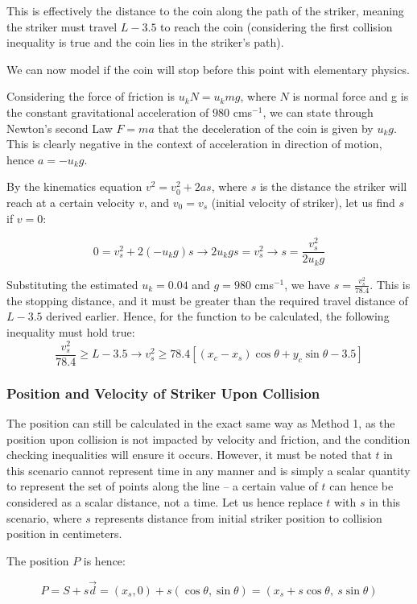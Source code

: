 \documentclass[10pt]{article}
\begin{document}
This is effectively the distance to the coin along the path of the striker, meaning the striker must travel $L-3.5$ to reach the coin (considering the first collision inequality is true and the coin lies in the striker's path). 

We can now model if the coin will stop before this point with elementary physics. 

Considering the force of friction is $u_kN = u_kmg$, where $N$ is normal force and g is the constant gravitational acceleration of $980$ cms$^{-1}$, we can state through Newton's second Law $F=ma$ that the deceleration of the coin is given by $u_kg$. This is clearly negative in the context of acceleration in direction of motion, hence $a=-u_kg$.

By the kinematics equation $v^2=v_0^2 + 2as$, where $s$ is the distance the striker will reach at a certain velocity $v$, and $v_0 = v_s$ (initial velocity of striker), let us find $s$ if $v=0$:

\[
0=v_s^2 + 2(-u_kg)s \longrightarrow 2u_kgs=v_s^2 \longrightarrow s=\frac{v_s^2}{2u_kg}
\]

Substituting the estimated $u_k = 0.04$ and $g=980$ cms$^{-1}$, we have $s=\frac{v_s^2}{78.4}$. This is the stopping distance, and it must be greater than the required travel distance of $L-3.5$ derived earlier. Hence, for the function to be calculated, the following inequality must hold true:
\[
\frac{v_s^2}{78.4} \geq L-3.5 \longrightarrow v_s^2 \geq 78.4[(x_c-x_s)\cos\theta+y_c\sin\theta - 3.5]
\]

\subsubsection{Position and Velocity of Striker Upon Collision} 

The position can still be calculated in the exact same way as Method 1, as the position upon collision is not impacted by velocity and friction, and the condition checking inequalities will ensure it occurs. However, it must be noted that $t$ in this scenario cannot represent time in any manner and is simply a scalar quantity to represent the set of points along the line -- a certain value of $t$ can hence be considered as a scalar distance, not a time. Let us hence replace $t$ with $s$ in this scenario, where $s$ represents distance from initial striker position to collision position in centimeters.

The position $P$ is hence:

\[
P = S+s\vec{d} = (x_s,0)+s(\cos\theta,\sin\theta) =\left( x_s + s \cos \theta,\ s \sin \theta \right)
\]
\end{document}
